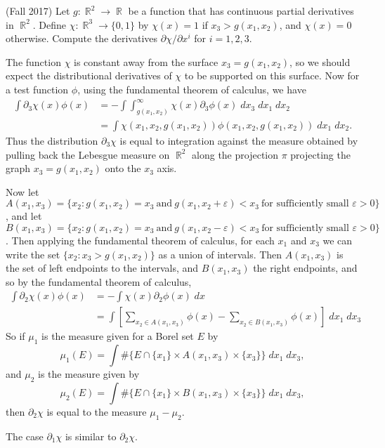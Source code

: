 \documentclass[answers]{exam}
\DeclareMathOperator{\RR}{\mathbb{R}}
\begin{document}
\begin{questions}
\question (Fall 2017) Let $g: \RR^2 \to \RR$ be a function that has continuous partial derivatives in $\RR^2$. Define $\chi: \RR^3 \to \{ 0, 1 \}$ by $\chi(x) = 1$ if $x_3 > g(x_1,x_2)$, and $\chi(x) = 0$ otherwise. Compute the derivatives $\partial \chi / \partial x^i$ for $i = 1, 2, 3$.
\begin{solution}
		The function $\chi$ is constant away from the surface $x_3 = g(x_1,x_2)$, so we should expect the distributional derivatives of $\chi$ to be supported on this surface. Now for a test function $\phi$, using the fundamental theorem of calculus, we have
		\begin{align*}
			\int \partial_3 \chi(x) \phi(x) &= - \int \int_{g(x_1,x_2)}^\infty \chi(x) \partial_3 \phi(x)\; dx_3 \; dx_1\; dx_2\\
			&= \int \chi(x_1,x_2, g(x_1,x_2)) \phi(x_1,x_2,g(x_1,x_2))\; dx_1\; dx_2.
		\end{align*}
		Thus the distribution $\partial_3 \chi$ is equal to integration against the measure obtained by pulling back the Lebesgue measure on $\RR^2$ along the projection $\pi$ projecting the graph $x_3 = g(x_1,x_2)$ onto the $x_3$ axis.

		Now let $A(x_1,x_3) = \{ x_2 : g(x_1,x_2) = x_3\ \text{and}\ g(x_1,x_2 + \varepsilon) < x_3\ \text{for sufficiently small $\varepsilon > 0$} \}$, and let $B(x_1,x_3) = \{ x_2 : g(x_1,x_2) = x_3\ \text{and}\ g(x_1,x_2 - \varepsilon) < x_3\ \text{for sufficiently small $\varepsilon > 0$} \}$. Then applying the fundamental theorem of calculus, for each $x_1$ and $x_3$ we can write the set $\{ x_2 : x_3 > g(x_1,x_2) \}$ as a union of intervals. Then $A(x_1,x_3)$ is the set of left endpoints to the intervals, and $B(x_1,x_3)$ the right endpoints, and so by the fundamental theorem of calculus,
		\begin{align*}
			\int \partial_2 \chi(x) \phi(x) &= - \int \chi(x) \partial_2 \phi(x)\; dx\\
			&= \int \left[\sum_{x_2 \in A(x_1,x_3)} \phi(x) - \sum_{x_2 \in B(x_1,x_3)} \phi(x) \right]\; dx_1\; dx_3
		\end{align*}
		So if $\mu_1$ is the measure given for a Borel set $E$ by
		\[ \mu_1(E) = \int \# \{ E \cap \{x_1 \} \times A(x_1,x_3) \times \{ x_3 \} \}\; dx_1\; dx_3, \]
		and $\mu_2$ is the measure given by
		\[ \mu_2(E) = \int \# \{ E \cap \{x_1 \} \times B(x_1,x_3) \times \{ x_3 \} \}\; dx_1\; dx_3, \]
		then $\partial_2 \chi$ is equal to the measure $\mu_1 - \mu_2$.

		The case $\partial_1 \chi$ is similar to $\partial_2 \chi$.
\end{solution}


\end{questions}
\end{document}
